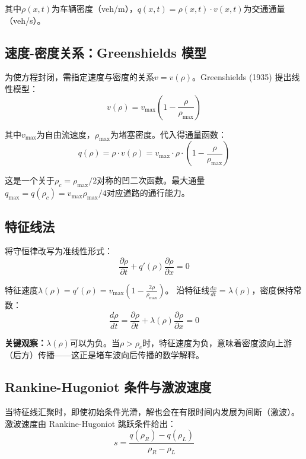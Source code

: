 \documentclass[12pt,a4paper]{ctexart}
\begin{document}
其中$\rho(x,t)$为车辆密度（veh/m），$q(x,t) = \rho(x,t) \cdot v(x,t)$为交通通量（veh/s）。

\subsection{速度-密度关系：Greenshields 模型}

为使方程封闭，需指定速度与密度的关系$v = v(\rho)$。Greenshields (1935) 提出线性模型：
\begin{equation}
    v(\rho) = v_{\max}\left(1 - \frac{\rho}{\rho_{\max}}\right)
    \label{eq:greenshields}
\end{equation}

其中$v_{\max}$为自由流速度，$\rho_{\max}$为堵塞密度。代入得通量函数：
\begin{equation}
    q(\rho) = \rho \cdot v(\rho) = v_{\max} \cdot \rho \cdot \left(1 - \frac{\rho}{\rho_{\max}}\right)
    \label{eq:flux}
\end{equation}

这是一个关于$\rho_c = \rho_{\max}/2$对称的凹二次函数。最大通量$q_{\max} = q(\rho_c) = v_{\max}\rho_{\max}/4$对应道路的通行能力。

\subsection{特征线法}

将守恒律改写为准线性形式：
\begin{equation}
    \frac{\partial \rho}{\partial t} + q'(\rho)\frac{\partial \rho}{\partial x} = 0
\end{equation}

特征速度$\lambda(\rho) = q'(\rho) = v_{\max}\left(1 - \frac{2\rho}{\rho_{\max}}\right)$。
沿特征线$\frac{dx}{dt} = \lambda(\rho)$，密度保持常数：
\begin{equation}
    \frac{d\rho}{dt} = \frac{\partial \rho}{\partial t} + \lambda(\rho)\frac{\partial \rho}{\partial x} = 0
\end{equation}

\textbf{关键观察：}$\lambda(\rho)$可以为负。当$\rho > \rho_c$时，特征速度为负，意味着密度波向上游（后方）传播——这正是堵车波向后传播的数学解释。

\subsection{Rankine-Hugoniot 条件与激波速度}

当特征线汇聚时，即使初始条件光滑，解也会在有限时间内发展为间断（激波）。
激波速度由 Rankine-Hugoniot 跳跃条件给出：
\begin{equation}
    s = \frac{q(\rho_R) - q(\rho_L)}{\rho_R - \rho_L}
    \label{eq:rh}
\end{equation}
\end{document}

